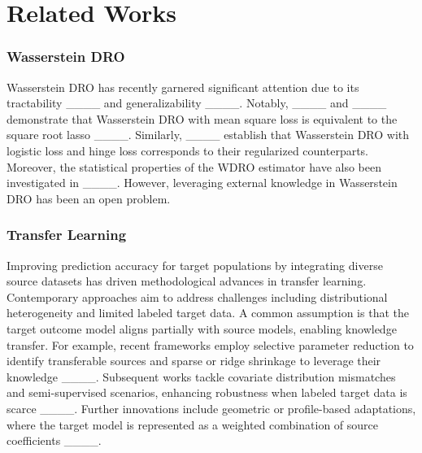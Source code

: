 \section{Related Works}
\subsubsection{Wasserstein DRO}
Wasserstein DRO  has recently garnered significant attention due to its tractability ____ and generalizability ____. Notably, ____ and ____ demonstrate that Wasserstein DRO with mean square loss is equivalent to the square root lasso ____. Similarly, ____ establish that Wasserstein DRO with logistic loss and hinge loss corresponds to their regularized counterparts. Moreover, the statistical properties of the WDRO estimator have also been investigated in ____. However, leveraging external knowledge in Wasserstein DRO has been an open problem.

\subsubsection{Transfer Learning}\label{sec:review:tl}
Improving prediction accuracy for target populations by integrating diverse source datasets has driven methodological advances in transfer learning. Contemporary approaches aim to address challenges including distributional heterogeneity and limited labeled target data. A common assumption is that the target outcome model aligns partially with source models, enabling knowledge transfer. For example, recent frameworks employ selective parameter reduction to identify transferable sources and sparse or ridge shrinkage to leverage their knowledge ____. Subsequent works tackle covariate distribution mismatches and semi-supervised scenarios, enhancing robustness when labeled target data is scarce ____. Further innovations include geometric or profile-based adaptations, where the target model is represented as a weighted combination of source coefficients ____. 

